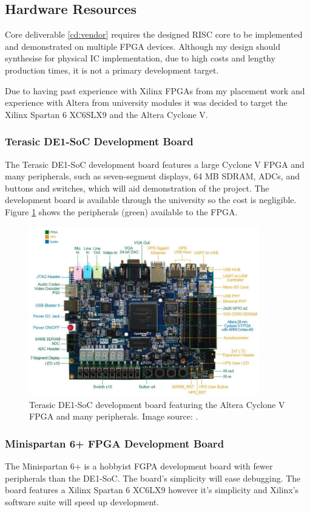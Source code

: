 \documentclass[11pt,a4paper]{report}
\begin{document}
{\subsection{Hardware Resources}
Core deliverable \ref{cd:vendor} requires the designed RISC core to be implemented and demonstrated on multiple FPGA devices.  Although my design should synthesise for physical IC implementation, due to high costs and lengthy production times, it is not a primary development target.

Due to having past experience with Xilinx FPGAs from my placement work and experience with Altera from university modules it was decided to target the Xilinx Spartan 6 XC6SLX9 and the Altera Cyclone V.

\subsubsection{Terasic DE1-SoC Development Board}
The Terasic DE1-SoC development board features a large Cyclone V FPGA and many peripherals, such as seven-segment displays, 64 MB SDRAM, ADCs, and buttons and switches, which will aid demonstration of the project. The development board is available through the university so the cost is negligible. Figure \ref{fig:de1soc} shows the peripherals (green) available to the FPGA.

\begin{figure}[h]
\centering 
\includegraphics[width=10cm]{../img/de1soc}
\caption{Terasic DE1-SoC development board featuring the Altera Cyclone V FPGA and many peripherals. Image source: \cite{de1soc}.}
\label{fig:de1soc}
\end{figure}

\subsubsection{Minispartan 6+ FPGA Development Board}
The Minispartan 6+ is a hobbyist FGPA development board with fewer peripherals than the DE1-SoC. The board's simplicity will ease debugging. The board features a Xilinx Spartan 6 XC6LX9 however it's simplicity and Xilinx's software suite will speed up development.

}
\end{document}
